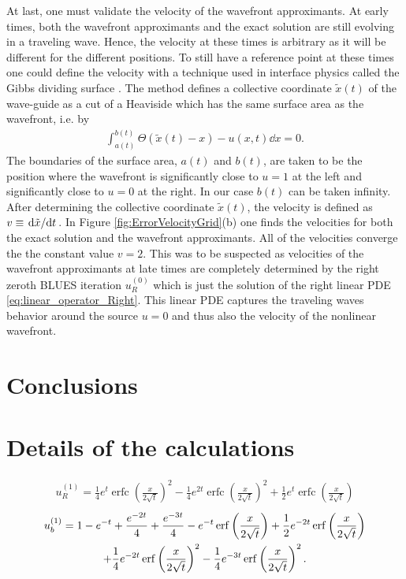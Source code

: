 \documentclass[amsmath,amssymb,amsfonts,aps,pre,preprint,superscriptaddress,bibnotes,showpacs,showkeys,longbibliography]{revtex4-1}
\DeclareMathOperator{\erfc}{erfc}
\begin{document}
At last, one must validate the velocity of the wavefront approximants. At early times, both the wavefront approximants and the exact solution are still evolving in a traveling wave. Hence, the velocity at these times is arbitrary as it will be different for the different positions. To still have a reference point at these times one could define the velocity with a technique used in interface physics called the Gibbs dividing surface \cite{gibbs1928collected,Lamorgese2017}. The method defines a collective coordinate $\tilde{x}(t)$ of the wave-guide as a cut of a Heaviside which has the same surface area as the wavefront, i.e. by
\begin{align}\label{eq:Gibbs_dividing_surface}
    \int_{a(t)}^{b(t)}  \Theta(\tilde{x}(t)-x)-u(x, t)\dd{x}  =0.
\end{align}
The boundaries of the surface area, $a(t)$ and $b(t)$, are taken to be the position where the wavefront is significantly close to $u=1$ at the left and significantly close to $u=0$ at the right. In our case $b(t)$ can be taken infinity. After determining the collective coordinate $\tilde{x}(t)$, the velocity is defined as $v\equiv \dv*{\tilde{x}}{t}$. In Figure \ref{fig:ErrorVelocityGrid}(b) one finds the velocities for both the exact solution and the wavefront approximants. All of the velocities converge the the constant value $v=2$. This was to be suspected as velocities of the wavefront approximants at late times are completely determined by the right zeroth BLUES iteration $u^{(0)}_R$ which is just the solution of the right linear PDE \eqref{eq:linear_operator_Right}. This linear PDE captures the traveling waves behavior around the source $u=0$ and thus also the velocity of the nonlinear wavefront.



\section{Conclusions}
\lipsum[2-3]
\label{sec:conclusions}
\cleardoublepage
\appendix
\section{Details of the calculations}
\label{sec:Details_of_the_calculculations}
\begin{align}
    u^{(1)}_R = \frac{1}{4} e^t \erfc\left(\frac{x}{2 \sqrt{t}}\right)^2-\frac{1}{4} e^{2 t} \erfc\left(\frac{x}{2 \sqrt{t}}\right)^2+\frac{1}{2} e^t \erfc\left(\frac{x}{2 \sqrt{t}}\right)
\end{align}
\begin{multline}
    u^{(1)}_b 
   =1-e^{-t}+\frac{e^{-2 t}}{4}+\frac{e^{-3 t}}{4}-e^{-t} \erf\left(\frac{x}{2 \sqrt{t}}\right)+\frac{1}{2} e^{-2 t} \erf\left(\frac{x}{2 \sqrt{t}}\right)\\+\frac{1}{4} e^{-2 t} \erf\left(\frac{x}{2 \sqrt{t}}\right)^2-\frac{1}{4} e^{-3 t} \erf\left(\frac{x}{2 \sqrt{t}}\right)^2.
\end{multline}
\end{document}
